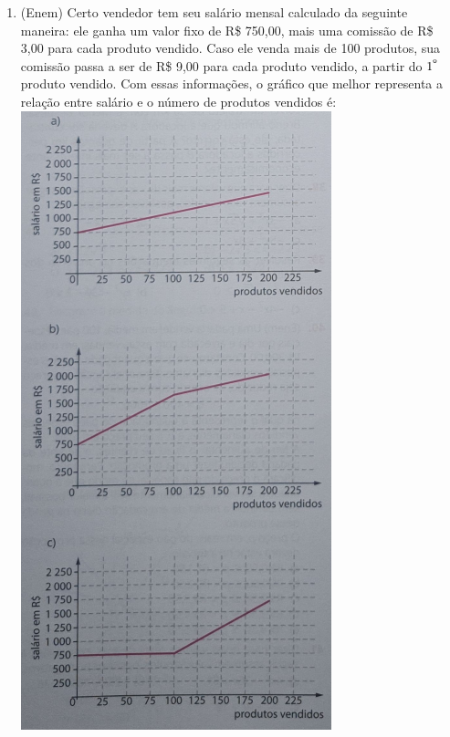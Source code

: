 \documentclass[a4paper,14pt]{article}
\begin{document}
\begin{multicols}{2}
\begin{enumerate}
\begin{enumerate}[a)]
    	    \end{enumerate}
            \item (Enem) Certo vendedor tem seu salário mensal calculado da seguinte maneira: ele ganha um valor fixo de R\$ 750,00, mais uma comissão de R\$ 3,00 para cada produto vendido. Caso ele venda mais de 100 produtos, sua comissão passa a ser de R\$ 9,00 para cada produto vendido, a partir do $1\textsuperscript{º}$ produto vendido. Com essas informações, o gráfico que melhor representa a relação entre salário e o número de produtos vendidos é:
            \includegraphics[width=1\linewidth]{imagens_8FMA74/imagem4}

\end{enumerate}
\end{multicols}
\end{document}
